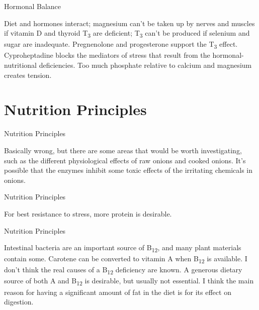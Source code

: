 \documentclass[11pt,oneside,openany,extrafontsizes]{memoir}
\begin{document}
\begin{standalonequote}{Hormonal Balance}

    \begin{answer}
      Diet and hormones interact; magnesium can't be taken up by nerves and muscles if vitamin D and thyroid T\textsubscript{3} are deficient; T\textsubscript{3} can't be produced if selenium and sugar are inadequate. Pregnenolone and progesterone support the T\textsubscript{3} effect. Cyproheptadine blocks the mediators of stress that result from the hormonal-nutritional deficiencies. Too much phosphate relative to calcium and magnesium creates tension.
    \end{answer}
\end{standalonequote}

\section{Nutrition Principles}

\begin{standalonequote}{Nutrition Principles}

    \begin{answer}
        Basically wrong, but there are some areas that would be worth investigating, such as the different physiological effects of raw onions and cooked onions. It's possible that the enzymes inhibit some toxic effects of the irritating chemicals in onions.
    \end{answer}
\end{standalonequote}

\begin{standalonequote}{Nutrition Principles}

    \begin{answer}
        For best resistance to stress, more protein is desirable.
    \end{answer}
\end{standalonequote}

\begin{standalonequote}{Nutrition Principles}

    \begin{answer}
      Intestinal bacteria are an important source of B\textsubscript{12}, and many plant materials contain some. Carotene can be converted to vitamin A when B\textsubscript{12} is available. I don't think the real causes of a B\textsubscript{12} deficiency are known. A generous dietary source of both A and B\textsubscript{12} is desirable, but usually not essential. I think the main reason for having a significant amount of fat in the diet is for its effect on digestion.
    \end{answer}
\end{standalonequote}
\end{document}

